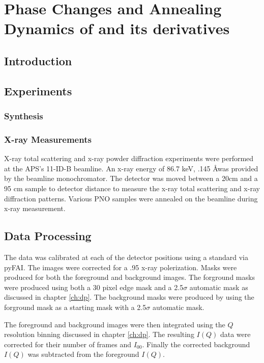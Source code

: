 \graphicspath{{./pno/figures/}}
\chapter{Phase Changes and Annealing Dynamics of  and its derivatives} \label{ch:pno}
\section{Introduction}
\section{Experiments}

\subsection{ Synthesis}

\subsection{X-ray Measurements}
X-ray total scattering and x-ray powder diffraction experiments were performed at the APS's 11-ID-B beamline.
An x-ray energy of 86.7 keV, .145 \AA was provided by the beamline monochromator.
The detector was moved between a 20cm and a 95 cm sample to detector distance to measure the x-ray total scattering and x-ray diffraction patterns.
Various PNO samples were annealed on the beamline during x-ray measurement.
\section{Data Processing}
The data was calibrated at each of the detector positions using a  standard via pyFAI. \cite{Kieffer2013}
The images were corrected for a .95 x-ray polerization.
Masks were produced for both the foreground and background images.
The forground masks were produced using both a 30 pixel edge mask and a 2.5$\sigma$ automatic mask as discussed in chapter \ref{ch:dp}.
The background masks were produced by using the forground mask as a starting mask with a 2.5$\sigma$ automatic mask.

The foreground and background images were then integrated using the $Q$ resolution binning discussed in chapter \ref{ch:dp}.
The resulting $I(Q)$ data were corrected for their number of frames and $I_{00}$.
Finally the corrected background $I(Q)$ was subtracted from the foreground $I(Q)$.

